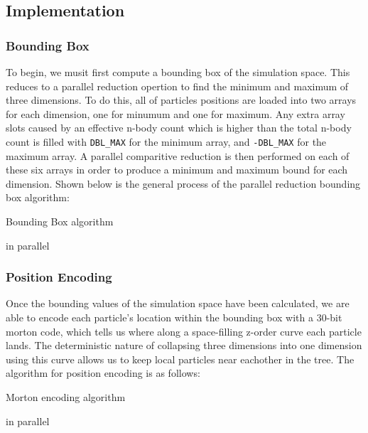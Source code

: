 \documentclass{thesis}
\begin{document}
\subsection{Implementation}
\subsubsection{Bounding Box}
To begin, we musit first compute a bounding box of the simulation space. This reduces to a parallel reduction opertion to find the minimum and maximum of three dimensions. To do this, all of particles positions are loaded into two arrays for each dimension, one for minumum and one for maximum. Any extra array slots caused by an effective n-body count which is higher than the total n-body count is filled with \verb|DBL_MAX| for the minimum array, and \verb|-DBL_MAX| for the maximum array. A parallel comparitive reduction is then performed on each of these six arrays in order to produce a minimum and maximum bound for each dimension. Shown below is the general process of the parallel reduction bounding box algorithm:
\begin{algorithm}
    \label{alg:BoundingBox}
    \caption{Bounding Box algorithm}
    \begin{algorithmic}
             in parallel
            \EndFor
        \EndFor
    \end{algorithmic}
\end{algorithm}
\subsubsection{Position Encoding}
Once the bounding values of the simulation space have been calculated, we are able to encode each particle's location within the bounding box with a 30-bit morton code, which tells us where along a space-filling z-order curve each particle lands. The deterministic nature of collapsing three dimensions into one dimension using this curve allows us to keep local particles near eachother in the tree. The algorithm for position encoding is as follows:
\begin{algorithm}
    \label{alg:PositionEncoding}
    \caption{Morton encoding algorithm}
    \begin{algorithmic}
         in parallel    
        \EndFor
    \end{algorithmic}
\end{algorithm}
\end{document}
